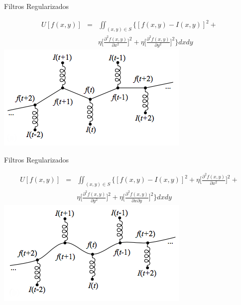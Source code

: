 \documentclass[]{beamer}
\begin{document}
\begin{frame}{Filtros Regularizados}
\begin{center}

\begin{eqnarray}
  U[f(x,y)] &=&\iint_{(x,y) \in S} \Bigg\{ [f(x,y)-I(x,y)]^2 +  \nonumber \\
     & & \eta \bigg[  \frac{\partial ^2 f(x,y)}{\partial x^2} \bigg]^2 +
            \eta \bigg[  \frac{\partial ^2 f(x,y)}{\partial y^2} \bigg]^2 
     \Bigg\} dx dy
\end{eqnarray}
\includegraphics[scale=0.6]{Images/RegularizadosResorte.png}

\end{center}
\end{frame}
\begin{frame}{Filtros Regularizados}
\begin{center}

\begin{eqnarray}
  U[f(x,y)] &=&\iint_{(x,y) \in S} \Bigg\{ [f(x,y)-I(x,y)]^2 + 
     \eta \bigg[  \frac{\partial ^2 f(x,y)}{\partial x^2} \bigg]^2 +
                \nonumber \\
      & &\eta \bigg[  \frac{\partial ^2 f(x,y)}{\partial y^2} \bigg]^2 +
     \eta \bigg[  \frac{\partial ^2 f(x,y)}{\partial x \partial y} \bigg]^2
     \Bigg\} dx dy
\end{eqnarray}
\includegraphics[scale=0.6]{Images/RegularizadosPlaca.png}

\end{center}
\end{frame}
\end{document}
